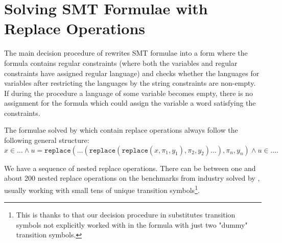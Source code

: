 \section{Solving SMT Formulae with Replace Operations}

The main decision procedure of \noodler rewrites SMT formulae into a form where the formula contains regular constraints (where both the variables and regular constraints have assigned regular language) and \noodler checks whether the languages for variables after restricting the languages by the string constraints are non-empty.
If during the procedure a language of some variable becomes empty, there is no assignment for the formula which could assign the variable a word satisfying the constraints.

The formulae solved by \noodler which contain replace operations always follow the following general structure:
$$ x \in \ldots \land u = \texttt{replace}(\ldots (\texttt{replace}(\texttt{replace}(x, \pi_1, y_1), \pi_2, y_2)\ldots), \pi_n, y_n) \land u \in \ldots \text{.}$$

We have a sequence of nested replace operations.
There can be between one and about 200 nested replace operations on the benchmarks from industry solved by \noodler, usually working with small tens of unique transition symbols\footnote{This is thanks to that our decision procedure in \noodler substitutes transition symbols not explicitly worked with in the formula with just two "dummy" transition symbols.}.

